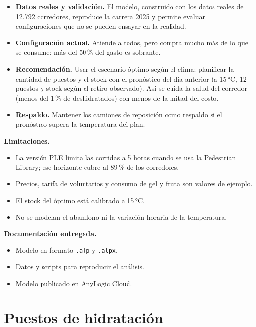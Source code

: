 \documentclass[11pt,a4paper]{article}
\begin{document}
\begin{itemize}
    \item \textbf{Datos reales y validación.} El modelo, construido con los datos reales de 12.792 corredores, reproduce la carrera 2025 y permite evaluar configuraciones que no se pueden ensayar en la realidad.
    \item \textbf{Configuración actual.} Atiende a todos, pero compra mucho más de lo que se consume: más del 50\,\% del gasto es sobrante.
    \item \textbf{Recomendación.} Usar el escenario óptimo según el clima: planificar la cantidad de puestos y el stock con el pronóstico del día anterior (a 15\,°C, 12 puestos y stock según el retiro observado). Así se cuida la salud del corredor (menos del 1\,\% de deshidratados) con menos de la mitad del costo.
    \item \textbf{Respaldo.} Mantener los camiones de reposición como respaldo si el pronóstico supera la temperatura del plan.
\end{itemize}

\textbf{Limitaciones.}
\begin{itemize}
    \item La versión PLE limita las corridas a 5 horas cuando se usa la Pedestrian Library; ese horizonte cubre al 89\,\% de los corredores.
    \item Precios, tarifa de voluntarios y consumo de gel y fruta son valores de ejemplo.
    \item El stock del óptimo está calibrado a 15\,°C.
    \item No se modelan el abandono ni la variación horaria de la temperatura.
\end{itemize}

\textbf{Documentación entregada.}
\begin{itemize}
    \item Modelo en formato \texttt{.alp} y \texttt{.alpx}.
    \item Datos y scripts para reproducir el análisis.
    \item Modelo publicado en AnyLogic Cloud.
\end{itemize}

\appendix
\section{Puestos de hidratación}
\end{document}
